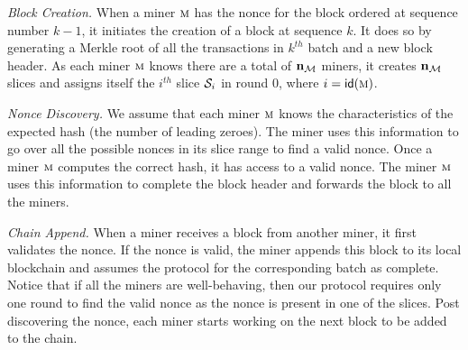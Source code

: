 {\em Block Creation.}
When a miner $\textsc{m}$ has the nonce for the block ordered at sequence number $k-1$, 
it initiates the creation of a block at sequence $k$. It does so by generating a Merkle root 
of all the transactions in $k^{th}$ batch and a new block header. As each miner 
$\textsc{m}{}$ knows there are a total of $\mathbf{n}_{\mathcal{M}}$ miners, it creates $\mathbf{n}_{\mathcal{M}}$ 
slices and assigns itself the $i^{th}$ slice $\mathcal{S}_{i}$ in round $0$, where 
$i = \mathop{\textsf{id}}(\textsc{m}{})$.

{\em Nonce Discovery.}
We assume that each miner $\textsc{m}{}$ knows the characteristics of the expected hash 
(the number of leading zeroes). The miner uses this information to go over all the 
possible nonces in its slice range to find a valid nonce. Once a miner $\textsc{m}$ 
computes the correct hash, it has access to a valid nonce. The miner $\textsc{m}$ uses 
this information to complete the block header and forwards the block to all the miners.

{\em Chain Append.}
When a miner receives a block from another miner, it first validates the nonce. If 
the nonce is valid, the miner appends this block to its local blockchain and assumes 
the \PoC{} protocol for the corresponding batch as complete.
% 
Notice that if all the miners are well-behaving, then our \PoC{} protocol requires 
only one round to find the valid nonce as the nonce is present in one of the slices.
Post discovering the nonce, each miner starts working on the next block to be added to 
the chain.

